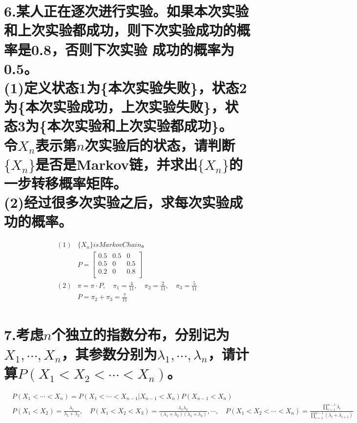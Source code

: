 \documentclass[UTF8]{ctexart}
\begin{document}
\section*{6.某人正在逐次进行实验。如果本次实验和上次实验都成功，则下次实验成功的概率是0.8，否则下次实验
  成功的概率为0.5。\\
  (1)定义状态1为\{本次实验失败\}，状态2为\{本次实验成功，上次实验失败\}，状态3为\{本次实验和上次实验都成功\}。
  令$X_n$表示第$n$次实验后的状态，请判断$\{X_n\}$是否是Markov链，并求出$\{X_n\}$的一步转移概率矩阵。\\
  (2)经过很多次实验之后，求每次实验成功的概率。}
\begin{equation*}
  \begin{aligned}
    (1) & \{X_n\} is Markov Chain。                                                              \\
        & P=\begin{bmatrix}
      0.5 & 0.5 & 0   \\
      0.5 & 0   & 0.5 \\
      0.2 & 0   & 0.8 \\
    \end{bmatrix}                                                            \\
    (2) & \pi=\pi\cdot P,\quad\pi_1=\frac{4}{11},\quad\pi_2=\frac{2}{11},\quad\pi_3=\frac{5}{11} \\
        & P=\pi_2+\pi_3=\frac{7}{11}                                                             \\
  \end{aligned}
\end{equation*}
\section*{7.考虑$n$个独立的指数分布，分别记为$X_1,\cdots,X_n$，其参数分别为$\lambda_1,\cdots,
    \lambda_n$，请计算$P(X_1<X_2<\cdots<X_n)$。}
\begin{equation*}
  \begin{aligned}
     & P(X_1<\cdots<X_n)=P(X_1<\cdots<X_{n-1}\lvert X_{n-1}<X_n)P(X_{n-1}<X_n)                                 \\
     & P(X_1<X_2)=\frac{\lambda_1}{\lambda_1+\lambda_2},\quad
    P(X_1<X_2<X_3)=\frac{\lambda_1\lambda_2}{(\lambda_1+\lambda_2)(\lambda_2+\lambda_3)},\cdots,\quad
    P(X_1<X_2<\cdots<X_n)=\frac{\prod\limits_{i=1}^{n-1}\lambda_i}{\prod_{i=1}^{n-1}(\lambda_i+\lambda_{i+1})} \\
  \end{aligned}
\end{equation*}
\end{document}

